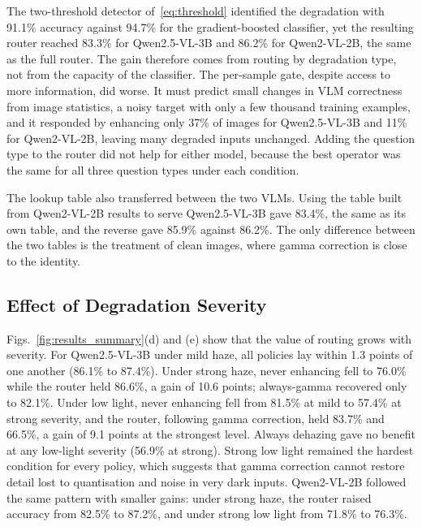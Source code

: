 \documentclass[lettersize,journal]{IEEEtran}
\begin{document}
The two-threshold detector of~\eqref{eq:threshold} identified the degradation with 91.1\% accuracy against 94.7\% for the gradient-boosted classifier, yet the resulting router reached 83.3\% for Qwen2.5-VL-3B and 86.2\% for Qwen2-VL-2B, the same as the full router. The gain therefore comes from routing by degradation type, not from the capacity of the classifier. The per-sample gate, despite access to more information, did worse. It must predict small changes in VLM correctness from image statistics, a noisy target with only a few thousand training examples, and it responded by enhancing only 37\% of images for Qwen2.5-VL-3B and 11\% for Qwen2-VL-2B, leaving many degraded inputs unchanged. Adding the question type to the router did not help for either model, because the best operator was the same for all three question types under each condition.

The lookup table also transferred between the two VLMs. Using the table built from Qwen2-VL-2B results to serve Qwen2.5-VL-3B gave 83.4\%, the same as its own table, and the reverse gave 85.9\% against 86.2\%. The only difference between the two tables is the treatment of clean images, where gamma correction is close to the identity.

\subsection{Effect of Degradation Severity}

Figs.~\ref{fig:results_summary}(d) and (e) show that the value of routing grows with severity. For Qwen2.5-VL-3B under mild haze, all policies lay within 1.3 points of one another (86.1\% to 87.4\%). Under strong haze, never enhancing fell to 76.0\% while the router held 86.6\%, a gain of 10.6 points; always-gamma recovered only to 82.1\%. Under low light, never enhancing fell from 81.5\% at mild to 57.4\% at strong severity, and the router, following gamma correction, held 83.7\% and 66.5\%, a gain of 9.1 points at the strongest level. Always dehazing gave no benefit at any low-light severity (56.9\% at strong). Strong low light remained the hardest condition for every policy, which suggests that gamma correction cannot restore detail lost to quantisation and noise in very dark inputs. Qwen2-VL-2B followed the same pattern with smaller gains: under strong haze, the router raised accuracy from 82.5\% to 87.2\%, and under strong low light from 71.8\% to 76.3\%.
\end{document}
